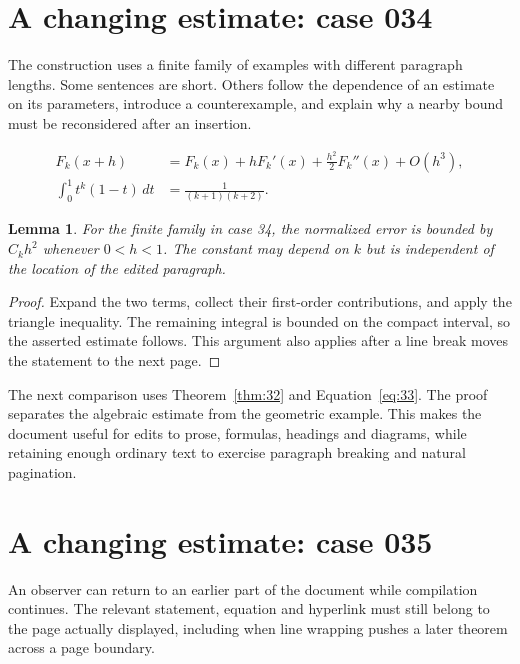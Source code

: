 \documentclass[a4paper,10pt]{article}
\newtheorem{lemma}[theorem]{Lemma}
\begin{document}
\lipsum[13]

\section{A changing estimate: case 034}\label{unit:33}
The construction uses a finite family of examples with different paragraph lengths. Some sentences are short. Others follow the dependence of an estimate on its parameters, introduce a counterexample, and explain why a nearby bound must be reconsidered after an insertion.

\lipsum[10-11]
\begin{align}\label{eq:33}
 F_k(x+h)&=F_k(x)+hF_k'(x)+\frac{h^2}{2}F_k''(x)+O(h^3),\\
 \int_0^1 t^k(1-t)\,dt&=\frac{1}{(k+1)(k+2)}.
\end{align}
\begin{lemma}\label{thm:33}
For the finite family in case 34, the normalized error is bounded by $C_k h^2$ whenever $0<h<1$. The constant may depend on $k$ but is independent of the location of the edited paragraph.
\end{lemma}
\begin{proof}
Expand the two terms, collect their first-order contributions, and apply the
triangle inequality. The remaining integral is bounded on the compact interval,
so the asserted estimate follows. This argument also applies after a line break
moves the statement to the next page.
\end{proof}
\begin{center}
\end{center}
The next comparison uses Theorem~\ref{thm:32} and Equation~\ref{eq:33}. The proof separates the algebraic estimate from the geometric example. This makes the document useful for edits to prose, formulas, headings and diagrams, while retaining enough ordinary text to exercise paragraph breaking and natural pagination.

\lipsum[18]

\section{A changing estimate: case 035}\label{unit:34}
An observer can return to an earlier part of the document while compilation continues. The relevant statement, equation and hyperlink must still belong to the page actually displayed, including when line wrapping pushes a later theorem across a page boundary.
\end{document}
